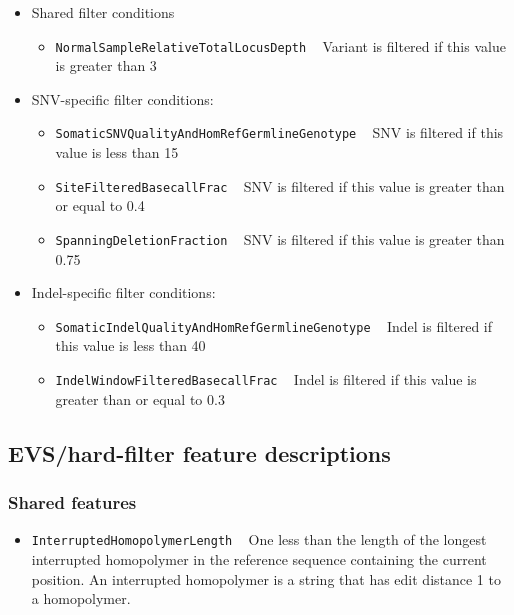 \documentclass{article}
\begin{document}
\begin{itemize}
    \item Shared filter conditions
    \begin{itemize}
        \item \texttt{NormalSampleRelativeTotalLocusDepth} ~ Variant is filtered if this value is greater than 3
    \end{itemize}
    \item SNV-specific filter conditions:
    \begin{itemize}
        \item \texttt{SomaticSNVQualityAndHomRefGermlineGenotype} ~ SNV is filtered if this value is less than 15
        \item \texttt{SiteFilteredBasecallFrac} ~ SNV is filtered if this value is greater than or equal to 0.4
        \item \texttt{SpanningDeletionFraction} ~ SNV is filtered if this value is greater than 0.75
    \end{itemize}
    \item Indel-specific filter conditions:
    \begin{itemize}
        \item \texttt{SomaticIndelQualityAndHomRefGermlineGenotype} ~ Indel is filtered if this value is less than 40
        \item \texttt{IndelWindowFilteredBasecallFrac} ~ Indel is filtered if this value is greater than or equal to 0.3
    \end{itemize}
\end{itemize}


\subsection{EVS/hard-filter feature descriptions}
\label{sec:ScoringFeatures}

\subsubsection{Shared features}
\begin{itemize}

    \item \texttt{InterruptedHomopolymerLength} ~ One less than the length of the longest interrupted homopolymer in the reference sequence containing the current position. An interrupted homopolymer is a string that has edit distance 1 to a homopolymer.

\end{itemize}
\end{document}

